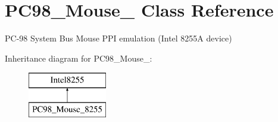 \hypertarget{classPC98__Mouse__8255}{\section{P\-C98\-\_\-\-Mouse\-\_ Class Reference}
\label{classPC98__Mouse__8255}
}


P\-C-\/98 System Bus Mouse P\-P\-I emulation (Intel 8255\-A device)  


Inheritance diagram for P\-C98\-\_\-\-Mouse\-\_\-:\begin{figure}[H]
\begin{center}
\leavevmode
\includegraphics[height=2.000000cm]{classPC98__Mouse__8255}
\end{center}
\end{figure}
